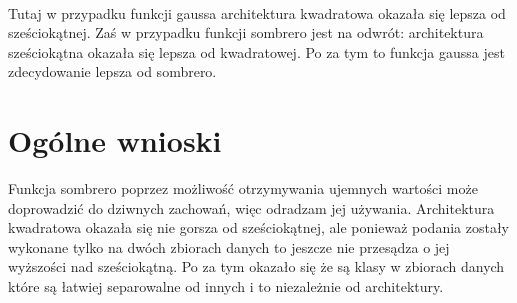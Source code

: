 \documentclass[11pt]{article}
\begin{document}
            
        
  

    
    \begin{center}
    \end{center}
    { \hspace*{\fill} \\}
    
    Tutaj w przypadku funkcji gaussa architektura kwadratowa okazała się
lepsza od sześciokątnej. Zaś w przypadku funkcji sombrero jest na
odwrót: architektura sześciokątna okazała się lepsza od kwadratowej. Po
za tym to funkcja gaussa jest zdecydowanie lepsza od sombrero.

    \hypertarget{oguxf3lne-wnioski}{%
\section{Ogólne wnioski}\label{oguxf3lne-wnioski}}

    Funkcja sombrero poprzez możliwość otrzymywania ujemnych wartości może
doprowadzić do dziwnych zachowań, więc odradzam jej używania.
Architektura kwadratowa okazała się nie gorsza od sześciokątnej, ale
ponieważ podania zostały wykonane tylko na dwóch zbiorach danych to
jeszcze nie przesądza o jej wyższości nad sześciokątną. Po za tym
okazało się że są klasy w zbiorach danych które są łatwiej separowalne
od innych i to niezależnie od architektury.


    
    
    
    
\end{document}
